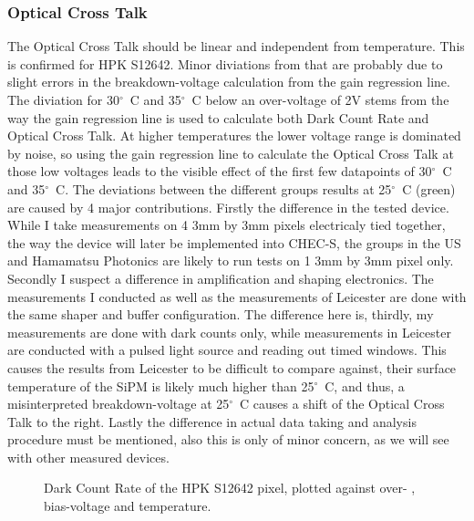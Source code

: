 \documentclass[article,type=msc,colorback,accentcolor=tud9c]{tudthesis}
\begin{document}
\newpage
\subsubsection{Optical Cross Talk}
The Optical Cross Talk should be linear and independent from temperature. This is confirmed for HPK S12642. Minor diviations from that are probably due to slight errors in the breakdown-voltage calculation from the gain regression line. The diviation for 30${^\circ}$~C and 35${^\circ}$~C below an over-voltage of 2V stems from the way the gain regression line is used to calculate both Dark Count Rate and Optical Cross Talk. At higher temperatures the lower voltage range is dominated by noise, so using the gain regression line to calculate the Optical Cross Talk at those low voltages leads to the visible effect of the first few datapoints of 30${^\circ}$~C and 35${^\circ}$~C. 
The deviations between the different groups results at 25${^\circ}$~C (green) are caused by 4 major contributions. Firstly the difference in the tested device. While I take measurements on 4 3mm by 3mm pixels electricaly tied together, the way the device will later be implemented into CHEC-S, the groups in the US and Hamamatsu Photonics are likely to run tests on 1 3mm by 3mm pixel only. Secondly I suspect a difference in amplification and shaping electronics. The measurements I conducted as well as the measurements of Leicester are done with the same shaper and buffer configuration. The difference here is, thirdly, my measurements are done with dark counts only, while measurements in Leicester are conducted with a pulsed light source and reading out timed windows. This causes the results from Leicester to be difficult to compare against, their surface temperature of the SiPM is likely much higher than 25${^\circ}$~C, and thus, a misinterpreted breakdown-voltage at 25${^\circ}$~C causes a shift of the Optical Cross Talk to the right. Lastly the difference in actual data taking and analysis procedure must be mentioned, also this is only of minor concern, as we will see with other measured devices.
\begin{figure}[h]
\begin{centering}
\caption{Dark Count Rate of the HPK S12642 pixel, plotted against over- , bias-voltage and temperature.}
\label{fig:S12642_OCT}
\end{centering}
\end{figure}
\newpage
\end{document}
